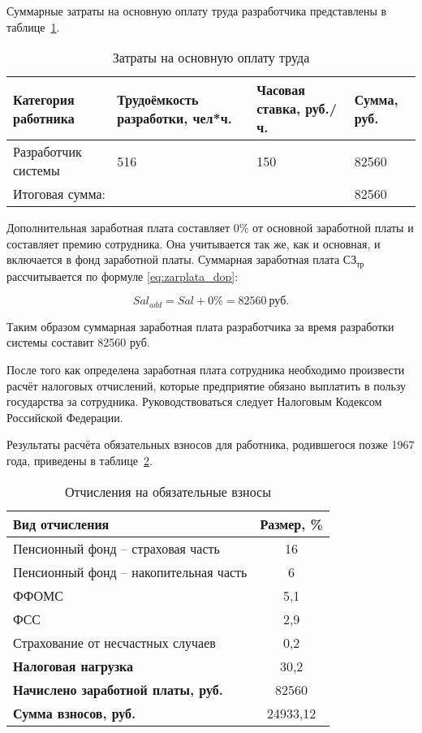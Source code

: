 Суммарные затраты на основную оплату труда разработчика представлены в таблице~\ref{tab:zarplata}.

\begin{footnotesize}
\begin{longtable}[h]{|p{}|p{}|p{}|p{}|}
	\caption{\label{tab:zarplata}Затраты на основную оплату труда} \\
	\hline
		\textbf{Категория работника} &
		\textbf{Трудоёмкость разработки, чел*ч.} &
		\textbf{Часовая ставка, руб./ч.} &
		\textbf{Сумма, руб.} \\
	\hline
		Разработчик системы & 516 & 150 & 82560 \\ \hline
		\multicolumn{3}{|l|}{Итоговая сумма:} & 82560 \\ \hline
\end{longtable}
\end{footnotesize}

Дополнительная заработная плата составляет 0\% от основной заработной платы и составляет премию сотрудника.
Она учитывается так же, как и основная, и включается в фонд заработной платы.
Суммарная заработная плата $СЗ_{тр}$ рассчитывается по формуле \ref{eq:zarplata_dop}: 

\begin{equation}
	\label{eq:zarplata_dop}
	Sal_{add} = Sal + 0\% = 82560~\text{руб}.
\end{equation}

Таким образом суммарная заработная плата разработчика за время разработки системы составит 82560 руб. 

После того как определена заработная плата сотрудника необходимо произвести расчёт налоговых отчислений, которые предприятие обязано выплатить в пользу государства за сотрудника.
Руководствоваться следует Налоговым Кодексом Российской Федерации.

Результаты расчёта обязательных взносов для работника, родившегося позже 1967 года, приведены в таблице~\ref{tab:zarplata_nalog}.

\begin{table}[h!]
\caption{\label{tab:zarplata_nalog}Отчисления на обязательные взносы}
\begin{footnotesize}
\begin{tabular}{|l|c|}
	\hline
	\textbf{Вид отчисления} & \textbf{Размер, \%} \\
	\hline 
	Пенсионный фонд -- страховая часть & 16 \\ 
	Пенсионный фонд -- накопительная часть & 6 \\
	ФФОМС & 5,1 \\ 
	ФСС & 2,9 \\ 
	Страхование от несчастных случаев & 0,2 \\
	\hline
	\textbf{Налоговая нагрузка} & 30,2 \\ \hline
	\textbf{Начислено заработной платы, руб.} & 82560 \\ \hline
	\textbf{Сумма взносов, руб.} & 24933,12 \\ \hline
\end{tabular}
\end{footnotesize}
\end{table}

